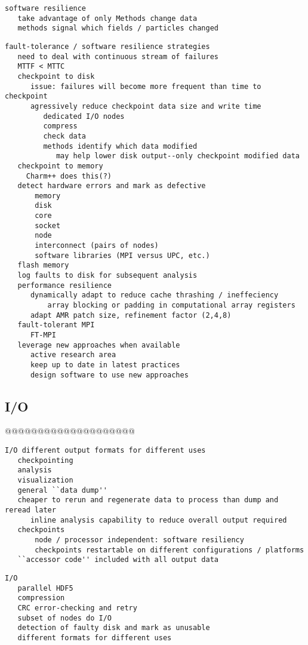 \documentclass{article}
\begin{document}
\begin{verbatim}
software resilience
   take advantage of only Methods change data
   methods signal which fields / particles changed
\end{verbatim}
\begin{verbatim}
fault-tolerance / software resilience strategies
   need to deal with continuous stream of failures
   MTTF < MTTC
   checkpoint to disk
      issue: failures will become more frequent than time to checkpoint
      agressively reduce checkpoint data size and write time
         dedicated I/O nodes
         compress
         check data
         methods identify which data modified
            may help lower disk output--only checkpoint modified data
   checkpoint to memory
     Charm++ does this(?)
   detect hardware errors and mark as defective
       memory
       disk
       core
       socket
       node
       interconnect (pairs of nodes)
       software libraries (MPI versus UPC, etc.)
   flash memory
   log faults to disk for subsequent analysis
   performance resilience
      dynamically adapt to reduce cache thrashing / ineffeciency
          array blocking or padding in computational array registers
      adapt AMR patch size, refinement factor (2,4,8)
   fault-tolerant MPI
      FT-MPI
   leverage new approaches when available
      active research area
      keep up to date in latest practices
      design software to use new approaches
\end{verbatim}

\subsection{I/O} \label{ss:design-io}

@@@@@@@@@@@@@@@@@@@@

\begin{verbatim}
I/O different output formats for different uses
   checkpointing
   analysis
   visualization
   general ``data dump''
   cheaper to rerun and regenerate data to process than dump and reread later
      inline analysis capability to reduce overall output required
   checkpoints
       node / processor independent: software resiliency
       checkpoints restartable on different configurations / platforms
   ``accessor code'' included with all output data
\end{verbatim}
\begin{verbatim}
I/O
   parallel HDF5
   compression
   CRC error-checking and retry
   subset of nodes do I/O
   detection of faulty disk and mark as unusable
   different formats for different uses
\end{verbatim}
\end{document}
